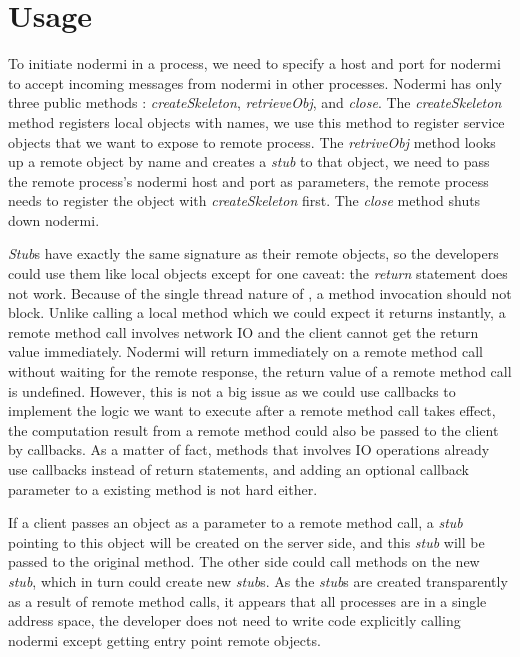 \section{Usage}

To initiate nodermi in a process, we need to specify a host and port for nodermi
to accept incoming messages from nodermi in other processes.
Nodermi has only three public methods : \emph{createSkeleton},
\emph{retrieveObj}, and \emph{close}.
The \emph{createSkeleton} method registers local objects with names,
we use this method to register service objects that we want to expose to 
remote process.
The \emph{retriveObj} method looks up a remote object by name and creates
a \emph{stub} to that object,
we need to pass the remote process's nodermi host and port as parameters,
the remote process needs to register the object with \emph{createSkeleton} first.
The \emph{close} method shuts down nodermi.

\emph{Stub}s have exactly the same signature as their remote objects,
so the developers could use them like local objects except for one caveat:
the \emph{return} statement does not work. 
Because of the single thread nature of \js{}, 
a method invocation should not block.
Unlike calling a local method which we could expect it returns instantly,
a remote method call involves network IO and the client cannot get the
return value immediately.
Nodermi will return immediately on a remote method call without waiting for 
the remote response, the return value of a remote method call is undefined.
However, this is not a big issue as we could use callbacks to 
implement the logic we want to execute after a remote method call takes effect,
the computation result from a remote method could also be passed to the client by callbacks.
As a matter of fact, methods that involves IO operations already use callbacks instead
of return statements, 
and adding an optional callback parameter to a existing method is not hard
either.

If a client passes an object as a parameter to a remote method call,
a \emph{stub} pointing to this object will be created on the server side,
and this \emph{stub} will be passed to the original method.
The other side could call methods on the new \emph{stub}, which
in turn could create new \emph{stub}s.
As the \emph{stub}s are created transparently 
as a result of remote method calls,
it appears that all processes are in a single address space,
the developer does not need to write code explicitly calling nodermi except
getting entry point remote objects.



